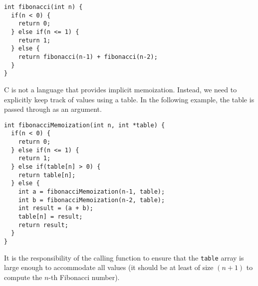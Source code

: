 \begin{verbatim}
int fibonacci(int n) {
  if(n < 0) {
    return 0;
  } else if(n <= 1) {
    return 1;
  } else {
    return fibonacci(n-1) + fibonacci(n-2);
  }
}
\end{verbatim}

C is not a language that provides implicit memoization.  Instead, 
we need to explicitly keep track of values using a table.  In the
following example, the table is passed through as an argument.

\begin{verbatim}
int fibonacciMemoization(int n, int *table) {
  if(n < 0) {
    return 0;
  } else if(n <= 1) {
    return 1;
  } else if(table[n] > 0) {
    return table[n];
  } else {
    int a = fibonacciMemoization(n-1, table);
    int b = fibonacciMemoization(n-2, table);
    int result = (a + b);
    table[n] = result;
    return result;
  }
}
\end{verbatim}

It is the responsibility of the calling function to ensure that the 
\texttt{table} array is large enough to accommodate all values
(it should be at least of size $(n+1)$ to compute the $n$-th Fibonacci
number).



